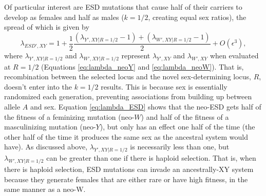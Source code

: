 \documentclass[10pt,letterpaper]{article}
\begin{document}
Of particular interest are ESD mutations that cause half of their carriers to develop as females and half as males ($k=1/2$, creating equal sex ratios), the spread of which is given by
\begin{equation}
\lambda_{ESD',XY} =1+ \frac{1}{2}\frac{(\lambda_{Y',XY\rvert R=1/2}-1) + (\lambda_{W',XY\rvert R=1/2}-1)}{2} + O\left(\epsilon^3\right),
\label{eq:lambda_ESD}
\end{equation}
\noindent
where $\lambda_{Y',XY\rvert R=1/2}$ and $\lambda_{W',XY\rvert R=1/2}$ represent $\lambda_{Y',XY}$ and $\lambda_{W',XY}$ when evaluated at $R=1/2$ (Equations \ref{eq:lambda_neoY} and \ref{eq:lambda_neoW}).
That is, recombination between the selected locus and the novel sex-determining locus, $R$, doesn't enter into the $k=1/2$ results.
This is because sex is essentially randomized each generation, %
preventing associations from building up between allele $A$ and sex. 
Equation \eqref{eq:lambda_ESD} shows that the neo-ESD gets half of the fitness of a feminizing mutation (neo-$W$) and half of the fitness of a masculinizing mutation (neo-$Y$), but only has an effect one half of the time (the other half of the time it produces the same sex as the ancestral system would have). 
As discussed above, $\lambda_{Y',XY\rvert R=1/2}$ is necessarily less than one, but $\lambda_{W',XY\rvert R=1/2}$ can be greater than one if there is haploid selection.
That is, when there is haploid selection, ESD mutations can invade an ancestrally-XY system because they generate females that are either rare or have high fitness, in the same manner as a neo-W. 
\end{document}
